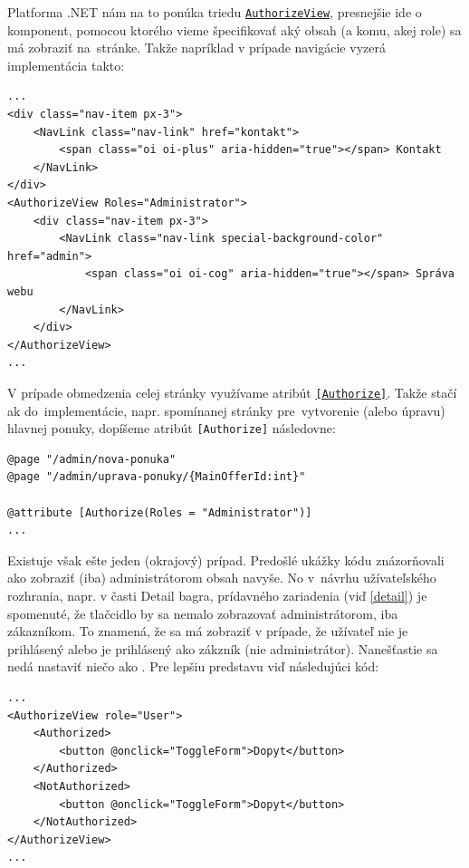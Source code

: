 Platforma .NET nám na to ponúka triedu \href{https://learn.microsoft.com/en-us/aspnet/core/blazor/security/?view=aspnetcore-7.0\#authorizeview-component}{\texttt{AuthorizeView}}, presnejšie ide o komponent, pomocou ktorého vieme špecifikovať aký obsah (a komu, akej role) sa má zobraziť na~stránke. Takže napríklad v prípade navigácie vyzerá implementácia takto:

\begin{verbatim}
...
<div class="nav-item px-3">
    <NavLink class="nav-link" href="kontakt">
        <span class="oi oi-plus" aria-hidden="true"></span> Kontakt
    </NavLink>
</div>
<AuthorizeView Roles="Administrator">
    <div class="nav-item px-3">
        <NavLink class="nav-link special-background-color" href="admin">
            <span class="oi oi-cog" aria-hidden="true"></span> Správa webu
        </NavLink>
    </div>
</AuthorizeView>
...
\end{verbatim}

V prípade obmedzenia celej stránky využívame atribút \href{https://learn.microsoft.com/en-us/aspnet/core/blazor/security/?view=aspnetcore-7.0\#authorize-attribute}{\texttt{[Authorize]}}. Takže stačí ak do~implementácie, napr. spomínanej stránky pre~vytvorenie (alebo úpravu) hlavnej ponuky, dopíšeme atribút \verb|[Authorize]| následovne:

\begin{verbatim}
@page "/admin/nova-ponuka"
@page "/admin/uprava-ponuky/{MainOfferId:int}"

@attribute [Authorize(Roles = "Administrator")]
...
\end{verbatim}

\iffalse

Existuje však ešte jeden (okrajový) prípad. Predošlé ukážky kódu znázorňovali ako zobraziť (iba) administrátorom obsah navyše. No v~návrhu užívateľského rozhrania, napr. v časti Detail bagra, prídavného zariadenia (viď \ref{detail}) je spomenuté, že tlačcidlo  by sa nemalo zobrazovať administrátorom, iba zákazníkom. To znamená, že sa má zobraziť v prípade, že užívateľ nie je prihlásený alebo je prihlásený ako zákzník (nie administrátor). Nanešťastie sa nedá nastaviť niečo ako . Pre lepšiu predstavu viď následujúci kód:

\begin{verbatim}
...
<AuthorizeView role="User">
	<Authorized>
		<button @onclick="ToggleForm">Dopyt</button>
	</Authorized>
	<NotAuthorized>
		<button @onclick="ToggleForm">Dopyt</button>
	</NotAuthorized>
</AuthorizeView>
...
\end{verbatim}

